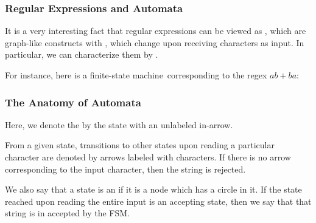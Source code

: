 \documentclass[aspectratio=169]{beamer}
\begin{document}

\begin{frame}[fragile]
  \frametitle{Regular Expressions and Automata}

  It is a very interesting fact that regular expressions can be viewed as
  , which are graph-like constructs with , 
  which change upon receiving characters as input. In particular, we can 
  characterize them by .

  \vspace{\fill}

  For instance, here is a finite-state machine\footnotemark\, corresponding to the regex $ab + ba$:

  \vspace{\fill}

\end{frame}

\begin{frame}[fragile]
  \frametitle{The Anatomy of Automata}


  \vspace{\fill}

  Here, we denote the  by the state with an unlabeled 
  in-arrow. 
  
  \vspace{\fill}

  From a given state, transitions to other states upon reading a 
  particular character are denoted by arrows labeled with characters. If there 
  is no arrow corresponding to the input character, then the string is rejected.

  \vspace{\fill}

  We also say that a state is an  if it is a node which
  has a circle in it. If the state reached upon reading the entire input is an
  accepting state, then we say that that string is in accepted by the FSM.
\end{frame}
\end{document}
